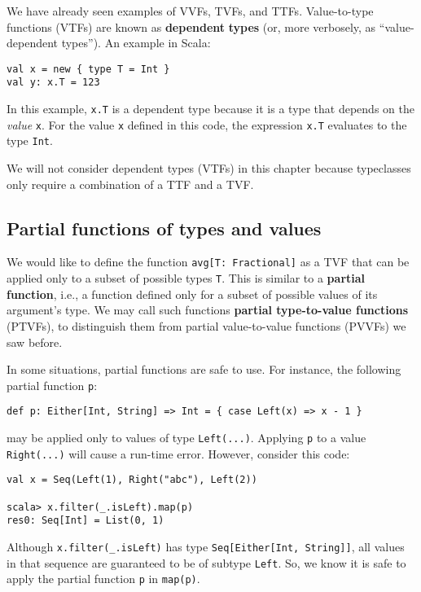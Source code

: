 We have already seen examples of VVFs, TVFs, and TTFs. Value-to-type
functions (VTFs) are known as \textbf{dependent} \textbf{types}
(or, more verbosely, as \textsf{``}value-dependent types\textsf{''}). An example in
Scala:
\begin{lstlisting}
val x = new { type T = Int }
val y: x.T = 123
\end{lstlisting}
In this example, \lstinline!x.T! is a dependent type because it is
a type that depends on the \emph{value} \lstinline!x!. For the value
\lstinline!x! defined in this code, the expression \lstinline!x.T!
evaluates to the type \lstinline!Int!. 

We will not consider dependent types (VTFs) in this chapter because
typeclasses only require a combination of a TTF and a TVF.

\subsection{Partial functions of types and values}

We would like to define the function \lstinline!avg[T: Fractional]!
as a TVF that can be applied only to a subset of possible types \lstinline!T!.
This is similar to a \textbf{partial function},
i.e., a function defined only for a subset of possible values of its
argument\textsf{'}s type. We may call such functions \textbf{partial type-to-value
functions} (PTVFs), to distinguish
them from partial value-to-value functions (PVVFs) we saw before.

In some situations, partial functions are safe to use. For instance,
the following partial function \lstinline!p!: 
\begin{lstlisting}
def p: Either[Int, String] => Int = { case Left(x) => x - 1 }
\end{lstlisting}
may be applied only to values of type \lstinline!Left(...)!. Applying
\lstinline!p! to a value \lstinline!Right(...)! will cause a run-time
error. However, consider this code:
\begin{lstlisting}
val x = Seq(Left(1), Right("abc"), Left(2))

scala> x.filter(_.isLeft).map(p)
res0: Seq[Int] = List(0, 1)
\end{lstlisting}
Although \lstinline!x.filter(_.isLeft)! has type \lstinline!Seq[Either[Int, String]]!,
all values in that sequence are guaranteed to be of subtype \lstinline!Left!.
So, we know it is safe to apply the partial function \lstinline!p!
in \lstinline!map(p)!. 

